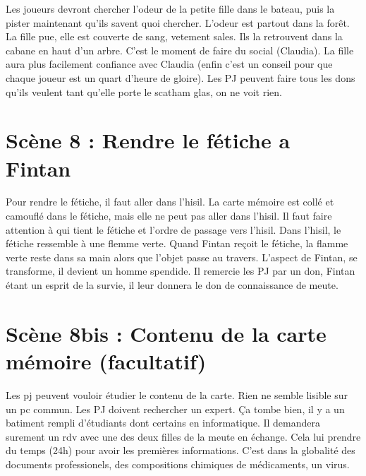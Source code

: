\documentclass[oneside,12pt]{book}
\begin{document}
\begin{flushleft}
Les joueurs devront chercher l'odeur de la petite fille dans le bateau, puis la pister maintenant qu'ils savent quoi chercher. L'odeur est partout dans la forêt.
La fille pue, elle est couverte de sang, vetement sales. Ils la retrouvent dans la cabane en haut d'un arbre. C'est le moment de faire du social (Claudia). 
La fille aura plus facilement confiance avec Claudia (enfin c'est un conseil pour que chaque joueur est un quart d'heure de gloire). 
Les PJ peuvent faire tous les dons qu'ils veulent tant qu'elle porte le scatham glas, on ne voit rien. 


\section{Scène 8 : Rendre le fétiche a Fintan}
Pour rendre le fétiche, il faut aller dans l'hisil. La carte mémoire est collé et camouflé dans le fétiche, mais elle ne peut pas aller dans l'hisil. Il faut faire attention à
qui tient le fétiche et l'ordre de passage vers l'hisil.  
Dans l'hisil, le fétiche ressemble à une flemme verte. 
Quand Fintan reçoit le fétiche, la flamme verte reste dans sa main alors que l'objet passe au travers. L'aspect de Fintan, se transforme, il devient un homme spendide.
Il remercie les PJ par un don, Fintan étant un esprit de la survie, il leur donnera le don de connaissance de meute. 

\section{Scène 8bis : Contenu de la carte mémoire (facultatif) } 
Les pj peuvent vouloir étudier le contenu de la carte. Rien ne semble lisible sur un pc commun. Les PJ doivent rechercher un expert. Ça tombe bien, 
il y a un batiment rempli d'étudiants dont certains en informatique.
Il demandera surement un rdv avec une des deux filles de la meute en échange.
Cela lui prendre du temps (24h) pour avoir les premières informations. 
C'est dans la globalité des documents professionels, des compositions chimiques de médicaments, un virus. 


\end{flushleft}
\end{document}
